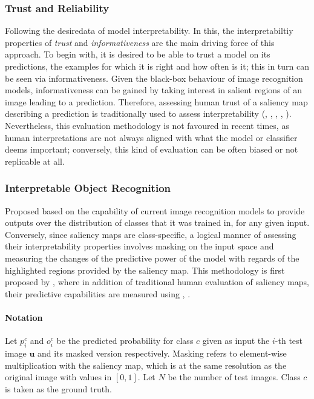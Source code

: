\subsubsection{Trust and Reliability} Following the desiredata of model interpretability. In this, 
the interpretabiltiy properties of \emph{trust} and \emph{informativeness} are the main driving 
force of this approach. To begin with, it is desired to be able to trust a model on its predictions, 
the examples for which it is right and how often is it; this in turn can be seen via 
informativeness. Given the black-box behaviour of image recognition models, informativeness can be 
gained by taking interest in salient regions of an image leading to a prediction. Therefore, 
assessing human trust of a saliency map describing a prediction is traditionally used to assess 
interpretability (\cite{ribeiro2016should}, \cite{zhou2016learning}, \cite{selvaraju2017grad}, 
\cite{chattopadhay2018grad}, \cite{bau2017network}). Nevertheless, this evaluation methodology is 
not favoured in recent times, as human interpretations are not always aligned with what the model 
or classifier deems important; conversely, this kind of evaluation can be often biased or not 
replicable at all.

\subsubsection{Interpretable Object Recognition} 
\label{sec:class_metrics}
Proposed based on the capability of current image 
recognition models to provide outputs over the distribution of classes that it was trained in, 
for any given input. Conversely, since saliency maps are class-specific, a logical manner of 
assessing their interpretability properties involves masking on the input space and measuring the 
changes of the predictive power of the model with regards of the highlighted regions provided by 
the saliency map. This methodology is first proposed by \cite{chattopadhay2018grad}, where in 
addition of traditional human evaluation of saliency maps, their predictive capabilities are 
measured using , .\\

\paragraph{Notation}
Let $p^c_i$ and $o^c_i$ be the predicted probability for class $c$ given as input  the $i$-th test 
image $\mathbf{u}$ and its masked version respectively. Masking refers to element-wise 
multiplication with the saliency map, which is at the same resolution as the original image with 
values in $[0,1]$. Let $N$ be the number of test images. Class $c$ is taken as the ground truth.\\

